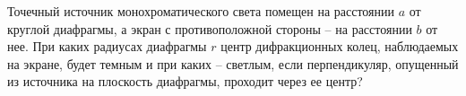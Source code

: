 \documentclass[__main__.tex]{subfiles}
\begin{document}
Точечный источник монохроматического света помещен на расстоянии $a$ от круглой диафрагмы, а экран с противоположной стороны -- на расстоянии $b$ от нее. При каких радиусах диафрагмы $r$ центр дифракционных колец, наблюдаемых на экране, будет темным и при каких -- светлым, если перпендикуляр, опущенный из источника на плоскость диафрагмы, проходит через ее центр?\\ 

\end{document}
